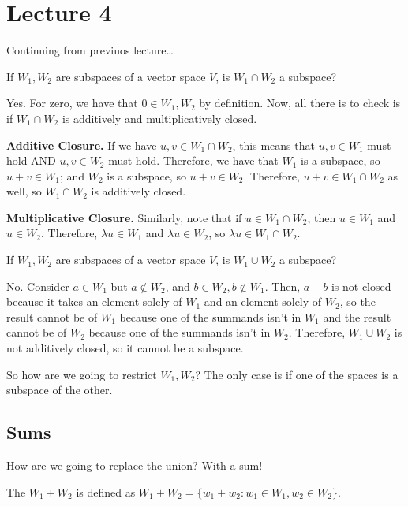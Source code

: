 \documentclass{book}
\begin{document}
\section{Lecture 4}
Continuing from previuos lecture\dots 

\begin{example}
	If $W_1, W_2$ are subspaces of a vector space $V$, is $W_1 \cap W_2$ a subspace?
\end{example}

\begin{solution} 
	Yes. For zero, we have that $0 \in W_1, W_2$ by definition. Now, all there is to check is if $W_1 \cap W_2$ is additively and multiplicatively closed.

	\textbf{Additive Closure.} If we have $u, v \in W_1 \cap W_2$, this means that $u, v \in W_1$ must hold AND $u, v \in W_2$ must hold. Therefore, we have that $W_1$ is a subspace, so $u + v \in W_1$; and $W_2$ is a subspace, so $u + v \in W_2$. Therefore, $u + v \in W_1 \cap W_2$ as well, so $W_1 \cap W_2$ is additively closed.

	\textbf{Multiplicative Closure.} Similarly, note that if $u \in W_1 \cap W_2$, then $u \in W_1$ and $u \in W_2$. Therefore, $\lambda u \in W_1$ and $\lambda u \in W_2$, so $\lambda u \in W_1 \cap W_2$.
\end{solution}

\begin{example}
	If $W_1, W_2$ are subspaces of a vector space $V$, is $W_1 \cup W_2$ a subspace?
\end{example}

\begin{solution}
	No. Consider $a \in W_1$ but $a \not\in W_2$, and $b \in W_2, b \not\in W_1$. Then, $a + b$ is not closed because it takes an element solely of $W_1$ and an element solely of $W_2$, so the result cannot be of $W_1$ because one of the summands isn't in $W_1$ and the result cannot be of $W_2$ because one of the summands isn't in $W_2$. Therefore, $W_1 \cup W_2$ is not additively closed, so it cannot be a subspace.
\end{solution}

So how are we going to restrict $W_1, W_2$? The only case is if one of the spaces is a subspace of the other.

\subsection{Sums}
How are we going to replace the union? With a sum!

\begin{definition}
	The  $W_1 + W_2$ is defined as $W_1 + W_2 = \{w_1 + w_2 : w_1 \in W_1, w_2 \in W_2\}$.
\end{definition}
\end{document}
